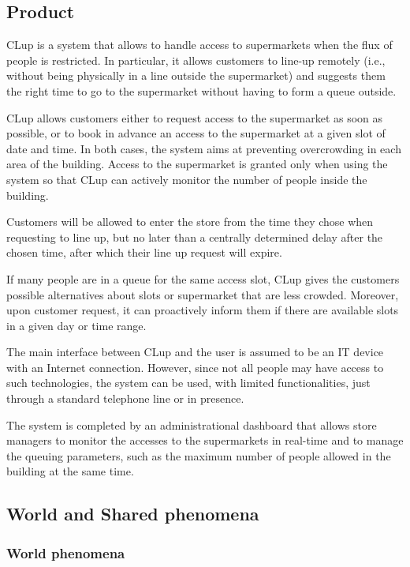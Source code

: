 \documentclass[../../main.tex]{subfiles}
\begin{document}
\subsection{Product}

CLup is a system that allows to handle access to supermarkets when the flux of
people is restricted. In particular, it allows customers to line-up remotely
(i.e., without being physically in a line outside the supermarket) and suggests
them the right time to go to the supermarket without having to form a queue
outside.

CLup allows customers either to request access to the supermarket as soon as
possible, or to book in advance an access to the supermarket at a given slot of
date and time. In both cases, the system aims at preventing overcrowding in each
area of the building. Access to the supermarket is granted only when using the
system so that CLup can actively monitor the number of people inside the
building.

Customers will be allowed to enter the store from the time they chose when requesting to line up, but no later than a centrally determined delay after the chosen time, after which their line up request will expire.

If many people are in a queue for the same access slot, CLup gives the customers
possible alternatives about slots or supermarket that are less crowded.
Moreover, upon customer request, it can proactively inform them if there are
available slots in a given day or time range.

The main interface between CLup and the user is assumed to be an IT device with
an Internet connection. However, since not all people may have access to such
technologies, the system can be used, with limited functionalities, just through
a standard telephone line or in presence.

The system is completed by an administrational dashboard that allows store
managers to monitor the accesses to the supermarkets in real-time and to manage
the queuing parameters, such as the maximum number of people allowed in the
building at the same time.

\subsection{World and Shared phenomena}


\subsubsection{World phenomena}
\end{document}
